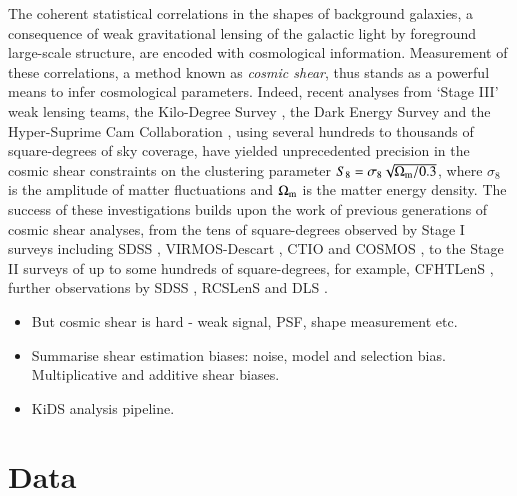 \documentclass{aa}
\begin{document}
The coherent statistical correlations in the shapes of background  galaxies, a consequence of weak gravitational lensing of the galactic light by foreground large-scale structure, are encoded with cosmological information. Measurement of these correlations, a method known as \textit{cosmic shear}, thus stands as a powerful means to infer cosmological parameters. Indeed, recent analyses from `Stage III' weak lensing teams, the Kilo-Degree Survey \citep[KiDS]{Hildebrandt_etal_2018}, the Dark Energy Survey \citep[DES]{DES_Cosmic_Shear_Yr1} and the Hyper-Suprime Cam Collaboration \citep[HSC]{Hamana_etal_2019}, using several hundreds to thousands of square-degrees of sky coverage, have yielded unprecedented precision in the cosmic shear constraints on the clustering parameter $S_8 = \sigma_8 \sqrt{ \Omega_{\rm m}/0.3 }$, where $\sigma_8$ is the amplitude of matter fluctuations and $\Omega_{\rm m}$ is the matter energy density. The success of these investigations builds upon the work of previous generations of cosmic shear analyses, from the tens of square-degrees observed by Stage I surveys including SDSS \citep{Hirata_etal_2004}, VIRMOS-Descart \citep{vanWaerbeke_etal_2005}, CTIO \citep{Jarvis_etal_2006} and COSMOS \citep{Schrabback_etal_2007}, to the Stage II surveys of up to some hundreds of square-degrees, for example, CFHTLenS \citep{Heymans_etal_2013}, further observations by SDSS \citep{Lin_etal_2012,Huff_etal_2014}, RCSLenS \citep{Hildebrandt_etal_2016b} and DLS \citep{Jee_etal_2016}.  

    

\begin{itemize}

\item But cosmic shear is hard - weak signal, PSF, shape measurement etc.

\item Summarise shear estimation biases: noise, model and selection bias. Multiplicative and additive shear biases.

\item KiDS analysis pipeline. 

\end{itemize}

\section{Data}
\end{document}
